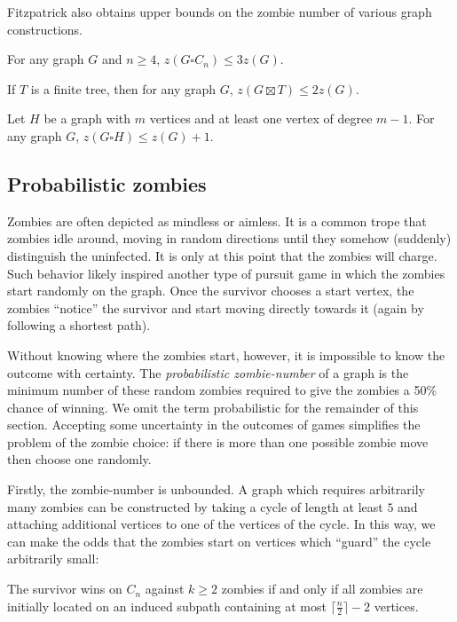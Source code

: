 Fitzpatrick also obtains upper bounds on the zombie number of various graph constructions.
\begin{theorem}
For any graph $G$ and $n \geq 4$, $z ( G \square C_n ) \leq 3 z ( G )$.
\end{theorem}

\begin{theorem}
If $T$ is a finite tree, then for any graph $G$, $z ( G \boxtimes T ) \leq 2 z ( G )$.
\end{theorem}

\begin{theorem}
Let $H$ be a graph with $m$ vertices and at least one vertex of degree $m - 1$. For any graph $G$, $z ( G \square H ) \leq z ( G ) + 1$.
\end{theorem}


\subsection{Probabilistic zombies}\label{subsection intro probabilistic}

Zombies are often depicted as mindless or aimless. It is a common trope that zombies
idle around, moving in random directions until they somehow (suddenly) distinguish
the uninfected. It is only at this point that the zombies will charge.
Such behavior likely inspired another type of pursuit game \cite{bonato2016probabilistic} in which the zombies start randomly on the graph. Once the survivor chooses a start vertex, the zombies ``notice'' the survivor and start moving directly towards it (again by following a shortest path).

Without knowing where the zombies start, however, it is impossible to know the outcome with certainty.
The \textit{probabilistic zombie-number} of a graph is the minimum number of these random zombies required to give the zombies a 50\% chance of winning. We omit the term probabilistic for the remainder of this section. Accepting some uncertainty in the outcomes of games simplifies the problem of the zombie choice: if there is more than one possible zombie move then choose one randomly.

Firstly, the zombie-number is unbounded. A graph which requires arbitrarily many zombies can be constructed by taking a cycle of length at least $5$ and attaching additional vertices to one of the vertices of the cycle. In this way, we can make the odds that the zombies start on vertices which ``guard'' the cycle arbitrarily small:
\begin{lemma}
The survivor wins on $C_n$ against $k \geq 2$ zombies if and only if all zombies are initially located on an induced subpath containing at most $\lceil\frac{n}{2}\rceil-2$ vertices. \label{lemma subpath}
\end{lemma}

